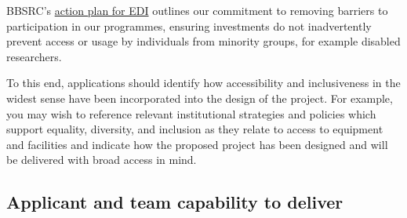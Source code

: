 \documentclass[12pt]{article}
\newenvironment{instruction}{\par\color{red}}{\par}
\begin{document}
\begin{instruction}
\begin{itemize}
\end{itemize}

BBSRC’s
\href{https://www.ukri.org/publications/bbsrc-equality-diversity-and-inclusion-action-plan/bbsrc-action-plan-for-equality-diversity-and-inclusion-in-the-biosciences-2022-to-2025/}{action
plan for EDI} outlines our commitment to removing barriers to participation in
our programmes, ensuring investments do not inadvertently prevent access or
usage by individuals from minority groups, for example disabled researchers.

To this end, applications should identify how accessibility and inclusiveness
in the widest sense have been incorporated into the design of the project. For
example, you may wish to reference relevant institutional strategies and
policies which support equality, diversity, and inclusion as they relate to
access to equipment and facilities and indicate how the proposed project has
been designed and will be delivered with broad access in mind.

\end{instruction}

\begin{bibunit}

\putbib
\end{bibunit}

\pagebreak
\subsection{Applicant and team capability to deliver}
\end{document}
